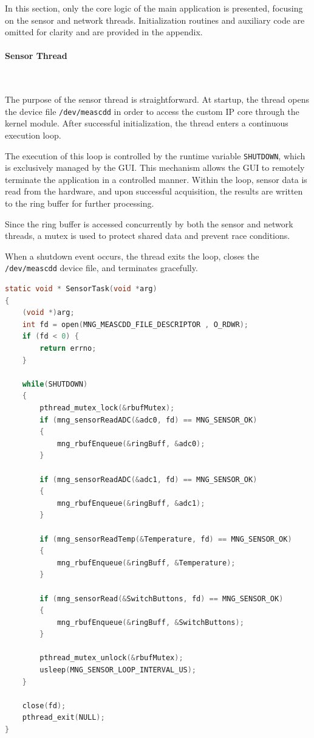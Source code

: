 \documentclass{article}
\begin{document}
In this section, only the core logic of the main application is presented, 
focusing on the sensor and network threads. Initialization routines and auxiliary code 
are omitted for clarity and are provided in the appendix.


\paragraph{Sensor Thread}\

The purpose of the sensor thread is straightforward. At startup, the thread opens the 
device file \texttt{/dev/meascdd} in order to access the custom IP core through the 
kernel module. After successful initialization, the thread enters a continuous execution 
loop.

The execution of this loop is controlled by the runtime variable \texttt{SHUTDOWN}, 
which is exclusively managed by the GUI. This mechanism allows the GUI to remotely 
terminate the application in a controlled manner. Within the loop, sensor data is read 
from the hardware, and upon successful acquisition, the results are written to the ring 
buffer for further processing.

Since the ring buffer is accessed concurrently by both the sensor and network threads, 
a mutex is used to protect shared data and prevent race conditions.

When a shutdown event occurs, the thread exits the loop, closes the \texttt{/dev/meascdd} 
device file, and terminates gracefully.
\newpage
\begin{lstlisting}[language=C,
caption={Sensor Thread Implementation},
label={lst:meascdd_read}]
static void * SensorTask(void *arg)
{
    (void *)arg;
    int fd = open(MNG_MEASCDD_FILE_DESCRIPTOR , O_RDWR);
	if (fd < 0) {
		return errno;
	}
    
    while(SHUTDOWN)
    {
        pthread_mutex_lock(&rbufMutex);
        if (mng_sensorReadADC(&adc0, fd) == MNG_SENSOR_OK)
        {           
            mng_rbufEnqueue(&ringBuff, &adc0);
        }

        if (mng_sensorReadADC(&adc1, fd) == MNG_SENSOR_OK)
        {           
            mng_rbufEnqueue(&ringBuff, &adc1);
        }

        if (mng_sensorReadTemp(&Temperature, fd) == MNG_SENSOR_OK)
        {
            mng_rbufEnqueue(&ringBuff, &Temperature);
        }

        if (mng_sensorRead(&SwitchButtons, fd) == MNG_SENSOR_OK)
        {
            mng_rbufEnqueue(&ringBuff, &SwitchButtons);
        }
        
        pthread_mutex_unlock(&rbufMutex);
        usleep(MNG_SENSOR_LOOP_INTERVAL_US);
    }

    close(fd);
    pthread_exit(NULL);
}
\end{lstlisting}
\end{document}

